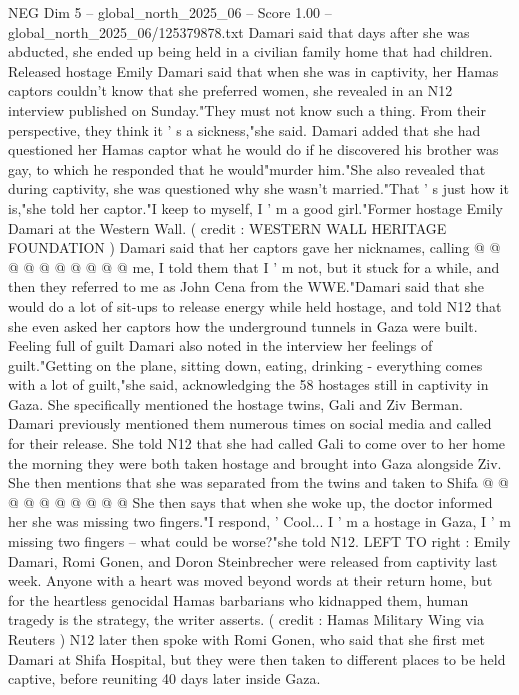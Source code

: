 \begin{textsample}{NEG Dim 5 – global\_north\_2025\_06 – Score 1.00 – global\_north\_2025\_06/125379878.txt}  \label{ex:f5_neg_390}
Damari said that days after she was abducted, she ended up being held in a civilian family home that had children.
Released hostage Emily Damari said that when she was in captivity, her Hamas captors couldn't know that she preferred women, she revealed in an N12 interview published on Sunday."They must not know such a thing.
From their perspective, they think it ' s a sickness,"she said.
Damari added that she had questioned her Hamas captor what he would do if he discovered his brother was gay, to which he responded that he would"murder him."She also revealed that during captivity, she was questioned why she wasn't married."That ' s just how it is,"she told her captor."I keep to myself, I ' m a good girl."Former hostage Emily Damari at the Western Wall. ( credit : WESTERN WALL HERITAGE FOUNDATION ) Damari said that her captors gave her nicknames, calling @ @ @ @ @ @ @ @ @ @ me, I told them that I ' m not, but it stuck for a while, and then they referred to me as John Cena from the WWE."Damari said that she would do a lot of sit-ups to release energy while held hostage, and told N12 that she even asked her captors how the underground tunnels in Gaza were built.
Feeling full of guilt Damari also noted in the interview her feelings of guilt."Getting on the plane, sitting down, eating, drinking - everything comes with a lot of guilt,"she said, acknowledging the 58 hostages still in captivity in Gaza.
She specifically mentioned the hostage twins, Gali and Ziv Berman.
Damari previously mentioned them numerous times on social media and called for their release.
She told N12 that she had called Gali to come over to her home the morning they were both taken hostage and brought into Gaza alongside Ziv.
She then mentions that she was separated from the twins and taken to Shifa @ @ @ @ @ @ @ @ @ @ She then says that when she woke up, the doctor informed her she was missing two fingers."I respond, ' Cool...
I ' m a hostage in Gaza, I ' m missing two fingers -- what could be worse?"she told N12.
LEFT TO right : Emily Damari, Romi Gonen, and Doron Steinbrecher were released from captivity last week.
Anyone with a heart was moved beyond words at their return home, but for the heartless genocidal Hamas barbarians who kidnapped them, human tragedy is the strategy, the writer asserts. ( credit : Hamas Military Wing via Reuters ) N12 later then spoke with Romi Gonen, who said that she first met Damari at Shifa Hospital, but they were then taken to different places to be held captive, before reuniting 40 days later inside Gaza.

\end{textsample}
